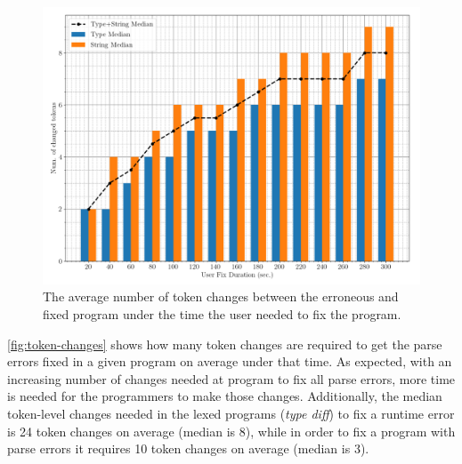 \begin{figure}[h]
  \centering
  \includegraphics[width=0.9\linewidth]{token-changes.png}
  \caption{The average number of token changes between the erroneous and fixed
  program under the time the user needed to fix the program.}
  \label{fig:token-changes}
\end{figure}

 \autoref{fig:token-changes} shows how many token
changes are required to get the parse errors fixed in a given program on average
under that time. As expected, with an increasing number of changes needed at
program to fix all parse errors, more time is needed for the programmers to make
those changes. Additionally, the median token-level changes needed in the lexed
programs (\eg \emph{type diff}) to fix a runtime error is 24 token changes on
average (median is 8), while in order to fix a program with parse errors it
requires 10 token changes on average (median is 3).
